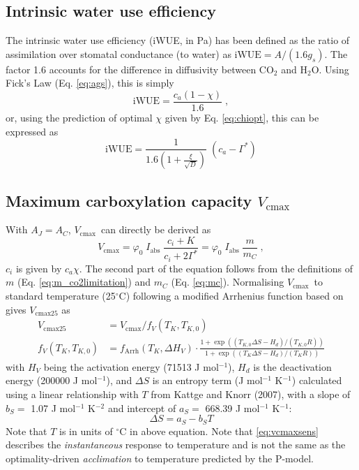 \documentclass[gmd, manuscript]{copernicus}
\newcommand{\vcmax}{$V_{\text{cmax}}$}
\begin{document}

\subsection{Intrinsic water use efficiency}
The intrinsic water use efficiency (iWUE, in Pa) has been defined as the ratio of assimilation over stomatal conductance (to water) \citep{beer09gbc} as $\text{iWUE} = A / (1.6 g_s)$. The factor 1.6 accounts for the difference in diffusivity between CO$_2$ and H$_2$O. Using Fick's Law (Eq. \ref{eq:ags}), this is simply
\begin{equation}
\label{eq:iwue}
    \mathrm{iWUE} = \frac{c_a (1-\chi)}{1.6} \;,
\end{equation}
or, using the prediction of optimal $\chi$ given by Eq. \ref{eq:chiopt}, this can be expressed as
\begin{equation}
    \text{iWUE} = \frac{1}{1.6 \left( 1+ \frac{\xi}{\sqrt{D}} \right) }\; (c_a - \Gamma^\ast)
\end{equation}

\subsection{Maximum carboxylation capacity
\label{sec:vcmax}
$V_{\mathrm{cmax}}$}
With $A_J=A_C$, \vcmax\ can directly be derived as 
\begin{equation}
    \label{eq:vcmax}
    V_{\mathrm{cmax}} = \varphi_0\;I_{\mathrm{abs}}\;\frac{c_i + K}{c_i + 2\Gamma^\ast} = \varphi_0\;I_{\mathrm{abs}}\; \frac{m}{m_C}\;,
\end{equation}
$c_i$ is given by $c_a \chi$. The second part of the equation follows from the definitions of $m$ (Eq. \ref{eq:m_co2limitation}) and $m_C$ (Eq. \ref{eq:mc}). Normalising \vcmax\ to standard temperature (25$^{\circ}$C) following a modified Arrhenius function based on \citet{kattge07} gives $V_{\mathrm{cmax25}}$ as
\begin{align}
    \label{eq:vcmax25}
    V_{\mathrm{cmax25}} &= V_{\mathrm{cmax}} / f_V (T_K, T_{K,0}) \\ 
    \label{eq:vcmaxsens}
    f_V (T_K, T_{K,0}) &= f_{\text{Arrh}}(T_K, \Delta H_V) \cdot \frac{1+\exp( (T_{K,0}\Delta S-H_d) / (T_{K,0} R) )}{1+\exp( (T_K\Delta S - H_d)/(T_K R) )}
\end{align}
with $H_V$ being the activation energy (71513 J mol$^{-1}$), $H_d$ is the deactivation energy (200000 J mol$^{-1}$), and $\Delta S$ is an entropy term (J mol$^{-1}$ K$^{-1}$) calculated using a linear relationship with $T$ from Kattge and Knorr (2007), with a slope of $b_S =$ 1.07 J mol$^{-1}$ K$^{-2}$ and intercept of $a_S = $ 668.39 J mol$^{-1}$ K$^{-1}$:
\begin{equation}
\label{eq:entropy}
    \Delta S = a_S - b_S T
\end{equation}
Note that $T$ is in units of $^{\circ}$C in above equation. Note that \ref{eq:vcmaxsens} describes the \textit{instantaneous} response to temperature and is not the same as the optimality-driven \textit{acclimation} to temperature predicted by the P-model.
\end{document}
